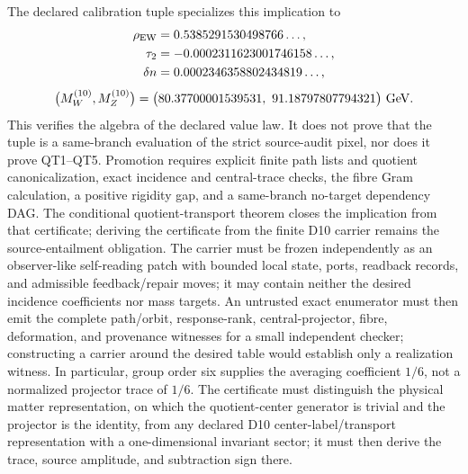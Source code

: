 \documentclass[11pt]{article}
\begin{document}
The declared calibration tuple specializes this implication to
\[
\begin{aligned}
\rho_{\rm EW}&=0.5385291530498766\ldots,\\
\tau_2&=-0.0002311623001746158\ldots,\\
\delta n&=0.0002346358802434819\ldots,
\end{aligned}
\]
\[
\bigl(M_W^{(10)},M_Z^{(10)}\bigr)
=
\bigl(80.37700001539531,\ 91.18797807794321\bigr)\ {\rm GeV}.
\]
This verifies the algebra of the declared value law. It does not prove that
the tuple is a same-branch evaluation of the strict source-audit
pixel, nor does it prove QT1--QT5.  Promotion requires explicit finite path
lists and quotient canonicalization, exact incidence and central-trace
checks, the fibre Gram calculation, a positive rigidity gap, and a same-branch
no-target dependency DAG.  The conditional quotient-transport theorem closes
the implication from that certificate; deriving the certificate from the
finite D10 carrier remains the source-entailment obligation.  The carrier must
be frozen independently as an observer-like self-reading patch with bounded
local state, ports, readback records, and admissible feedback/repair moves; it
may contain neither the desired incidence
coefficients nor mass targets.  An untrusted exact enumerator must then emit
the complete path/orbit, response-rank, central-projector, fibre, deformation,
and provenance witnesses for a small independent checker; constructing a
carrier around the desired table would establish only a realization witness.
In particular, group order six supplies the averaging coefficient \(1/6\),
not a normalized projector trace of \(1/6\).  The certificate must distinguish
the physical matter representation, on which the quotient-center generator is
trivial and the projector is the identity, from any declared D10
center-label/transport representation with a one-dimensional invariant sector;
it must then derive the trace, source amplitude, and subtraction sign there.
\end{document}
